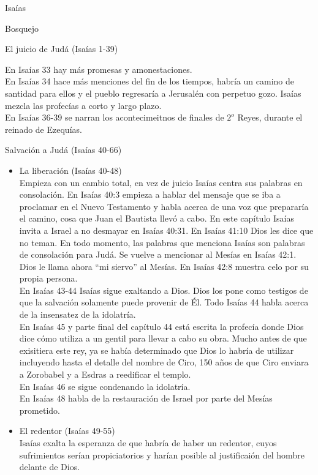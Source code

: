 \begin{section}{Isaías}
\begin{subsection}{Bosquejo}
\begin{subsubsection}{El juicio de Judá (Isaías 1-39)}
\begin{itemize}
	En Isaías 33 hay más promesas y amonestaciones.\\
	En Isaías 34 hace más menciones del fin de los tiempos, habría un camino de santidad para ellos y el pueblo regresaría a Jerusalén con perpetuo gozo. Isaías mezcla las profecías a corto y largo plazo.\\
	En Isaías 36-39 se narran los acontecimeitnos de finales de $2^{o}$ Reyes, durante el reinado de Ezequías.
		\end{itemize}
		\end{subsubsection}
		\begin{subsubsection}{Salvación a Judá (Isaías 40-66)}
			\begin{itemize}
				\item La liberación (Isaías 40-48)\\
					Empieza con un cambio total, en vez de juicio Isaías centra sus palabras en consolación. En Isaías 40:3 empieza a hablar del mensaje que se iba a proclamar en el Nuevo Testamento y habla acerca de una voz que prepararía el camino, cosa que Juan el Bautista llevó a cabo. En este capítulo Isaías invita a Israel a no desmayar en Isaías 40:31. En Isaías 41:10 Dios les dice que no teman. En todo momento, las palabras que menciona Isaías son palabras de consolación para Judá. Se vuelve a mencionar al Mesías en Isaías 42:1. Dios le llama ahora ``mi siervo'' al Mesías.
					\newpage
					En Isaías 42:8 muestra celo por su propia persona.\\
					En Isaías 43-44 Isaías sigue exaltando a Dios. Dios los pone como testigos de que la salvación solamente puede provenir de Él. Todo Isaías 44 habla acerca de la insensatez de la idolatría.\\
					En Isaías 45 y parte final del capítulo 44 está escrita la profecía donde Dios dice cómo utiliza a un gentil para llevar a cabo su obra. Mucho antes de que exisitiera este rey, ya se había determinado que Dios lo habría de utilizar incluyendo hasta el detalle del nombre de Ciro, 150 años de que Ciro enviara a Zorobabel y a Esdras a reedificar el templo.\\
					En Isaías 46 se sigue condenando la idolatría.\\
					En Isaías 48 habla de la restauración de Israel por parte del Mesías prometido.
				\item El redentor (Isaías 49-55)\\
					Isaías exalta la esperanza de que habría de haber un redentor, cuyos sufrimientos serían propiciatorios y harían posible al justificaión del hombre delante de Dios. \\

\end{itemize}
\end{subsubsection}
\end{subsection}
\end{section}
